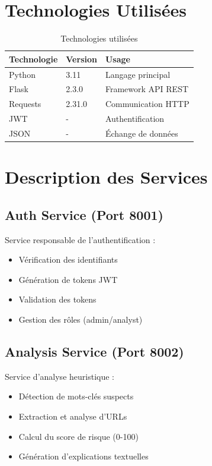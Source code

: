 \documentclass[12pt,a4paper]{article}
\begin{document}
\section{Technologies Utilisées}

\begin{table}[H]
\centering
\begin{tabular}{|l|l|l|}
\hline
\textbf{Technologie} & \textbf{Version} & \textbf{Usage} \\
\hline
Python & 3.11 & Langage principal \\
Flask & 2.3.0 & Framework API REST \\
Requests & 2.31.0 & Communication HTTP \\
JWT & - & Authentification \\
JSON & - & Échange de données \\
\hline
\end{tabular}
\caption{Technologies utilisées}
\end{table}

\section{Description des Services}

\subsection{Auth Service (Port 8001)}
Service responsable de l'authentification :
\begin{itemize}
    \item Vérification des identifiants
    \item Génération de tokens JWT
    \item Validation des tokens
    \item Gestion des rôles (admin/analyst)
\end{itemize}

\subsection{Analysis Service (Port 8002)}
Service d'analyse heuristique :
\begin{itemize}
    \item Détection de mots-clés suspects
    \item Extraction et analyse d'URLs
    \item Calcul du score de risque (0-100)
    \item Génération d'explications textuelles
\end{itemize}
\end{document}
